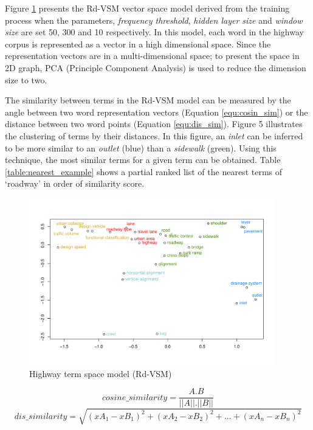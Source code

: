 \documentclass[Journal, BackFigs, DoubleSpace]{ascelike}%
\begin{document}
%
\par
Figure \ref{fig:hvsm} presents the Rd-VSM vector space model derived from the training process when the parameters, \textit{frequency threshold}, \textit{hidden layer size} and \textit{window size} are set 50, 300 and 10 respectively. In this model, each word in the highway corpus is represented as a vector in a high dimensional space. Since the representation vectors are in a multi-dimensional space; to present the space in 2D graph, PCA (Principle Component Analysis) is used to reduce the dimension size to two.
\par
The similarity between terms in the Rd-VSM model can be measured by the angle between two word representation vectors (Equation \ref{equ:cosin_sim}) or the distance between two word points (Equation \ref{equ:dis_sim}). Figure 5 illustrates the clustering of terms by their distances. In this figure, an \textit{inlet} can be inferred to be more similar to an \textit{outlet} (blue) than a \textit{sidewalk} (green). Using this technique, the most similar terms for a given term can be obtained. Table \ref{table:nearest_example} shows a partial ranked list of the nearest terms of `roadway' in order of similarity score.
%
\begin{figure}[t]
	\centering
	\includegraphics[width=0.95\textwidth]{Figure5_hvsm_space}
	\caption{Highway term space model (Rd-VSM)}
	\label{fig:hvsm}
\end{figure}
%
\begin{equation}
\label{equ:cosin_sim}
cosine\_similarity = \frac{A.B}{||A||.||B||}
\end{equation}
%
\begin{equation}
\label{equ:dis_sim}
dis\_similarity =\sqrt{(xA_1-xB_1)^2+(xA_2-xB_2)^2+...+(xA_n-xB_n)^2}
\end{equation}
\end{document}
